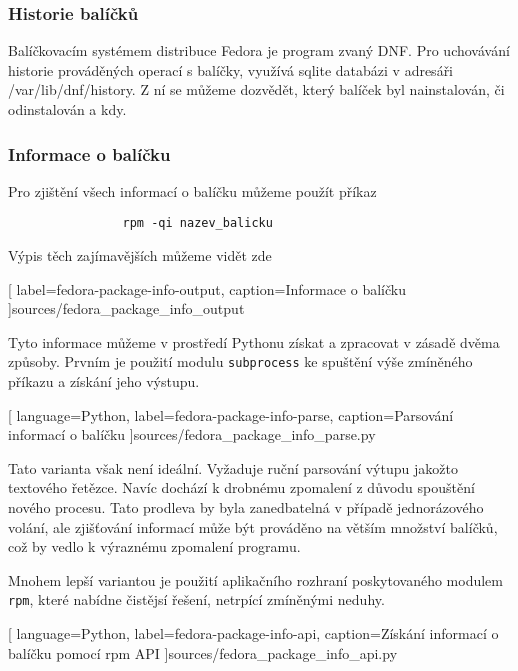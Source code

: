 \documentclass[10pt,a4paper]{article}
\begin{document}
			\subsubsection{Historie balíčků}
			Balíčkovacím systémem distribuce Fedora je program zvaný DNF\@. Pro uchovávání historie prováděných operací s balíčky, využívá sqlite databázi v adresáři /var/lib/dnf/history. Z ní se můžeme dozvědět, který balíček byl nainstalován, či odinstalován a kdy.


			\pagebreak
			\subsubsection{Informace o balíčku}
			Pro zjištění všech informací o balíčku můžeme použít příkaz

			\begin{lstlisting}
				rpm -qi nazev_balicku
			\end{lstlisting}

			Výpis těch zajímavějších můžeme vidět zde
			
			[
				label=fedora-package-info-output,
				caption={Informace o balíčku}
			]{sources/fedora_package_info_output}

			Tyto informace můžeme v prostředí Pythonu získat a zpracovat v zásadě dvěma způsoby. Prvním je použití modulu \texttt{subprocess} ke spuštění výše zmíněného příkazu a získání jeho výstupu.
			
			[
				language=Python,
				label=fedora-package-info-parse,
				caption={Parsování informací o balíčku}
			]{sources/fedora_package_info_parse.py}

			Tato varianta však není ideální. Vyžaduje ruční parsování výtupu jakožto textového řetězce. Navíc dochází k drobnému zpomalení z důvodu spouštění nového procesu. Tato prodleva by byla zanedbatelná v případě jednorázového volání, ale zjišťování informací může být prováděno na větším množství balíčků, což by vedlo k výraznému zpomalení programu.

			Mnohem lepší variantou je použití aplikačního rozhraní poskytovaného modulem \texttt{rpm}, které nabídne čistějsí řešení, netrpící zmíněnými neduhy.

			
			[
				language=Python,
				label=fedora-package-info-api,
				caption={Získání informací o balíčku pomocí rpm API}
			]{sources/fedora_package_info_api.py}
\end{document}
